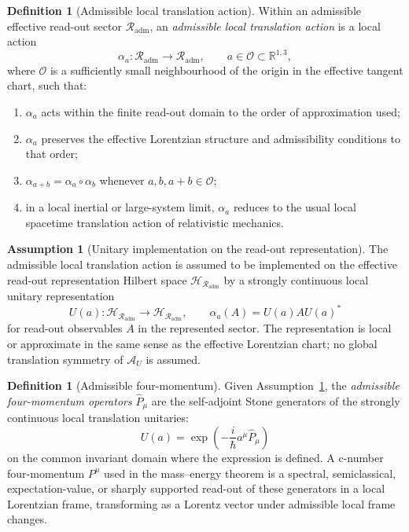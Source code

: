 \documentclass[12pt,a4paper]{article}
\theoremstyle{definition}
\newtheorem{definition}[theorem]{Definition}
\newtheorem{assumption}[theorem]{Assumption}
\theoremstyle{remark}
\newcommand{\AU}{\mathcal{A}_U}
\newcommand{\Rout}{\mathcal{R}_{\mathrm{adm}}}
\newcommand{\tightlist}{%
  \setlength{\itemsep}{0pt}\setlength{\parskip}{0pt}}
\begin{document}
\begin{definition}[Admissible local translation action]
\label{def:translation-generators}
Within an admissible effective read-out sector $\Rout$, an \emph{admissible local translation action} is a local action
\[
\alpha_a:\Rout\to\Rout,\qquad a\in\mathcal{O}\subset\mathbb{R}^{1,3},
\]
where $\mathcal{O}$ is a sufficiently small neighbourhood of the origin in the effective tangent chart, such that:
\begin{enumerate}[label=(\roman*), leftmargin=*]
\tightlist
\item $\alpha_a$ acts within the finite read-out domain to the order of approximation used;
\item $\alpha_a$ preserves the effective Lorentzian structure and admissibility conditions to that order;
\item $\alpha_{a+b}=\alpha_a\circ\alpha_b$ whenever $a,b,a+b\in\mathcal{O}$;
\item in a local inertial or large-system limit, $\alpha_a$ reduces to the usual local spacetime translation action of relativistic mechanics.
\end{enumerate}
\end{definition}

\begin{assumption}[Unitary implementation on the read-out representation]
\label{ass:unitary-implementation}
The admissible local translation action is assumed to be implemented on the effective read-out representation Hilbert space $\mathcal{H}_{\Rout}$ by a strongly continuous local unitary representation
\[
U(a):\mathcal{H}_{\Rout}\to\mathcal{H}_{\Rout},
\qquad
\alpha_a(A)=U(a)AU(a)^*
\]
for read-out observables $A$ in the represented sector. The representation is local or approximate in the same sense as the effective Lorentzian chart; no global translation symmetry of $\AU$ is assumed.
\end{assumption}

\begin{definition}[Admissible four-momentum]
\label{def:admissible-momentum}
Given Assumption~\ref{ass:unitary-implementation}, the \emph{admissible four-momentum operators} $\hat P_\mu$ are the self-adjoint Stone generators of the strongly continuous local translation unitaries:
\[
U(a)=\exp\!\left(-\frac{i}{\hbar}a^\mu \hat P_\mu\right)
\]
on the common invariant domain where the expression is defined. A c-number four-momentum $P^\mu$ used in the mass--energy theorem is a spectral, semiclassical, expectation-value, or sharply supported read-out of these generators in a local Lorentzian frame, transforming as a Lorentz vector under admissible local frame changes.
\end{definition}
\end{document}
